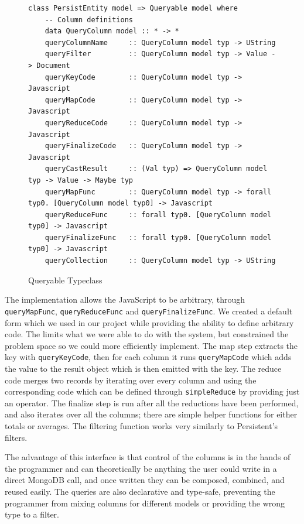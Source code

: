 \documentclass[letterpaper,twocolumn,9pt]{article}
\newcommand{\code}[1]{\texttt{#1}}
\begin{document}
\begin{figure}[t]
\footnotesize{
\begin{verbatim}
class PersistEntity model => Queryable model where
    -- Column definitions
    data QueryColumn model :: * -> *
    queryColumnName     :: QueryColumn model typ -> UString
    queryFilter         :: QueryColumn model typ -> Value -> Document
    queryKeyCode        :: QueryColumn model typ -> Javascript
    queryMapCode        :: QueryColumn model typ -> Javascript
    queryReduceCode     :: QueryColumn model typ -> Javascript
    queryFinalizeCode   :: QueryColumn model typ -> Javascript
    queryCastResult     :: (Val typ) => QueryColumn model typ -> Value -> Maybe typ
    queryMapFunc        :: QueryColumn model typ -> forall typ0. [QueryColumn model typ0] -> Javascript
    queryReduceFunc     :: forall typ0. [QueryColumn model typ0] -> Javascript
    queryFinalizeFunc   :: forall typ0. [QueryColumn model typ0] -> Javascript
    queryCollection     :: QueryColumn model typ -> UString
\end{verbatim}
}
    \caption{Queryable Typeclass}
    \label{queryable}
\end{figure}

The implementation allows the JavaScript to be arbitrary, through \code{queryMapFunc}, \code{queryReduceFunc} and \code{queryFinalizeFunc}.  We created a default form which we used in our project while providing the ability to define arbitrary code.  The limits what we were able to do with the system, but constrained the problem space so we could more efficiently implement.  The map step extracts the key with \code{queryKeyCode}, then for each column it runs \code{queryMapCode} which adds the value to the result object which is then emitted with the key.  The reduce code merges two records by iterating over every column and using the corresponding code which can be defined through \code{simpleReduce} by providing just an operator.  The finalize step is run after all the reductions have been performed, and also iterates over all the columns; there are simple helper functions for either totals or averages.  The filtering function works very similarly to Persistent's filters.

The advantage of this interface is that control of the columns is in the hands of the programmer and can theoretically be anything the user could write in a direct MongoDB call, and once written they can be composed, combined, and reused easily.  The queries are also declarative and type-safe, preventing the programmer from mixing columns for different models or providing the wrong type to a filter.
\end{document}
